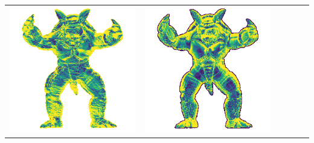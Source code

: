 \begin{tabularx}{\linewidth}{@{}Y@{}Y@{}Y@{}Y@{}Y@{}Y@{}}
\includegraphics[width=\linewidth]{semisynthetic/20160617_22_yu_err.png} &
\includegraphics[width=\linewidth]{semisynthetic/20160617_22_dpsn_err.png} &

\end{tabularx}
